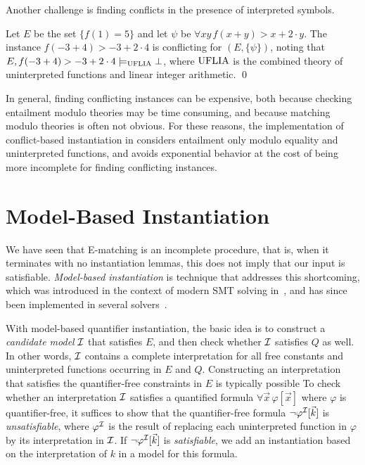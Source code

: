 \documentclass[oribibl]{llncs}
\begin{document}
Another challenge is finding conflicts in the presence of interpreted symbols.
\begin{example}
Let $E$ be the set $\{ f( 1 ) = 5 \}$ and let $\psi$ be $\forall xy\, f( x + y ) > x + 2 \cdot y$.
The instance $f( -3 + 4 ) > -3 + 2 \cdot 4$ is conflicting for $( E, \{ \psi \} )$,
noting that $E, f( -3 + 4 ) > -3 + 2 \cdot 4 \models_{\mathrm{UFLIA}} \bot$, where $\mathrm{UFLIA}$ is the combined
theory of uninterpreted functions and linear integer arithmetic.
\qed
\end{example}
In general, finding conflicting instances can be expensive, both because checking entailment modulo theories may be time consuming,
and because matching modulo theories is often not obvious.
For these reasons,
the implementation of conflict-based instantiation in \cvc
considers entailment only modulo equality and uninterpreted functions,
and avoids exponential behavior at the cost of being more incomplete for finding conflicting instances. 

\section{Model-Based Instantiation}
\label{sec:mbqi}

We have seen that E-matching is an incomplete procedure,
that is, when it terminates with no instantiation lemmas, this does not imply that our input is satisfiable.
\emph{Model-based instantiation} is technique that addresses this shortcoming,
which was introduced in the context of modern SMT solving in~\cite{},
and has since been implemented in several solvers~\cite{}.

With model-based quantifier instantiation, the basic idea is
to construct a \emph{candidate model} $\mathcal{I}$ that satisfies $E$, 
and then check whether $\mathcal{I}$ satisfies $Q$ as well.
In other words, $\mathcal{I}$ contains a complete interpretation for all free constants and uninterpreted functions occurring in $E$ and $Q$.
Constructing an interpretation that satisfies the quantifier-free constraints in $E$
is typically possible 
To check whether an interpretation $\mathcal{I}$ satisfies a quantified formula $\forall \vec x\, \varphi[ \vec x ]$ where $\varphi$ is quantifier-free,
it suffices to show that the quantifier-free formula $\neg \varphi^{\mathcal{I}}[ \vec k ]$ is \emph{unsatisfiable},
where $\varphi^{\mathcal{I}}$ is the result of replacing each uninterpreted function in $\varphi$
by its interpretation in $\mathcal{I}$.
If $\neg \varphi^{\mathcal{I}}[ \vec k ]$ is \emph{satisfiable}, we add an instantiation based on the interpretation of $k$ in a model
for this formula.
\end{document}
